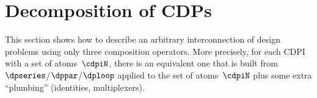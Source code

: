 
\section{Decomposition of CDPs}
\label{sec:Decomposition}


\label{sec:Decomposing2}
This section shows how to describe an arbitrary interconnection of design problems using only three composition operators.
More precisely, for each CDPI with a set of atoms~$\cdpiN$, there is an equivalent one that is built from $\dpseries$/$\dppar$/$\dploop$ applied to the set of atoms~$\cdpiN$ plus some extra ``plumbing'' (identities, multiplexers).




